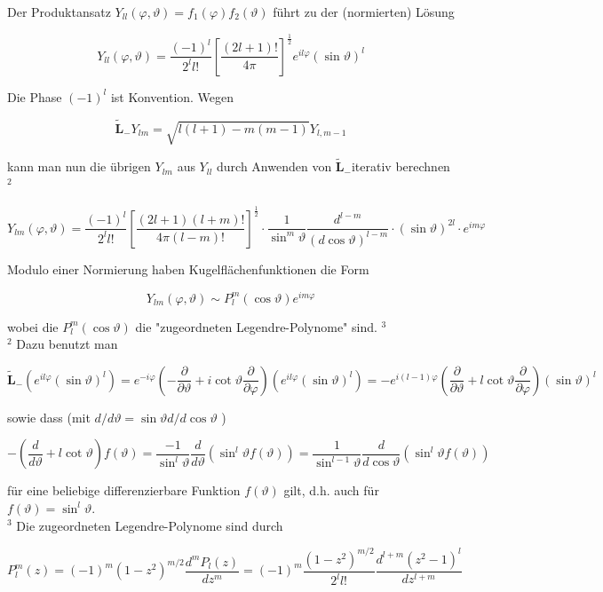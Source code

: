 \documentclass[10pt, letterpaper]{article}
\begin{document}
Der Produktansatz $Y_{l l}(\varphi, \vartheta)=f_{1}(\varphi) f_{2}(\vartheta)$ führt zu der (normierten) Lösung

$$
Y_{l l}(\varphi, \vartheta)=\frac{(-1)^{l}}{2^{l} l!}\left[\frac{(2 l+1)!}{4 \pi}\right]^{\frac{1}{2}} e^{i l \varphi}(\sin \vartheta)^{l}
$$

Die Phase $(-1)^{l}$ ist Konvention. Wegen

$$
\tilde{\mathbf{L}}_{-} Y_{l m}=\sqrt{l(l+1)-m(m-1)} Y_{l, m-1}
$$

kann man nun die übrigen $Y_{l m}$ aus $Y_{l l}$ durch Anwenden von $\tilde{\mathbf{L}}_{-}$iterativ berechnen ${ }^{2}$

$$
Y_{l m}(\varphi, \vartheta)=\frac{(-1)^{l}}{2^{l} l!}\left[\frac{(2 l+1)(l+m)!}{4 \pi(l-m)!}\right]^{\frac{1}{2}} \cdot \frac{1}{\sin ^{m} \vartheta} \frac{d^{l-m}}{(d \cos \vartheta)^{l-m}} \cdot(\sin \vartheta)^{2 l} \cdot e^{i m \varphi}
$$

Modulo einer Normierung haben Kugelflächenfunktionen die Form

$$
Y_{l m}(\varphi, \vartheta) \sim P_{l}^{m}(\cos \vartheta) e^{i m \varphi}
$$

wobei die $P_{l}^{m}(\cos \vartheta)$ die "zugeordneten Legendre-Polynome" sind. ${ }^{3}$\\
${ }^{2}$ Dazu benutzt man

$$
\tilde{\mathbf{L}}_{-}\left(e^{i l \varphi}(\sin \vartheta)^{l}\right)=e^{-i \varphi}\left(-\frac{\partial}{\partial \vartheta}+i \cot \vartheta \frac{\partial}{\partial \varphi}\right)\left(e^{i l \varphi}(\sin \vartheta)^{l}\right)=-e^{i(l-1) \varphi}\left(\frac{\partial}{\partial \vartheta}+l \cot \vartheta \frac{\partial}{\partial \varphi}\right)(\sin \vartheta)^{l}
$$

sowie dass (mit $d / d \vartheta=\sin \vartheta d / d \cos \vartheta$ )

$$
-\left(\frac{d}{d \vartheta}+l \cot \vartheta\right) f(\vartheta)=\frac{-1}{\sin ^{l} \vartheta} \frac{d}{d \vartheta}\left(\sin ^{l} \vartheta f(\vartheta)\right)=\frac{1}{\sin ^{l-1} \vartheta} \frac{d}{d \cos \vartheta}\left(\sin ^{l} \vartheta f(\vartheta)\right)
$$

für eine beliebige differenzierbare Funktion $f(\vartheta)$ gilt, d.h. auch für $f(\vartheta)=\sin ^{l} \vartheta$.\\
${ }^{3}$ Die zugeordneten Legendre-Polynome sind durch

$$
P_{l}^{m}(z)=(-1)^{m}\left(1-z^{2}\right)^{m / 2} \frac{d^{m} P_{l}(z)}{d z^{m}}=(-1)^{m} \frac{\left(1-z^{2}\right)^{m / 2}}{2^{l} l!} \frac{d^{l+m}\left(z^{2}-1\right)^{l}}{d z^{l+m}}
$$
\end{document}
